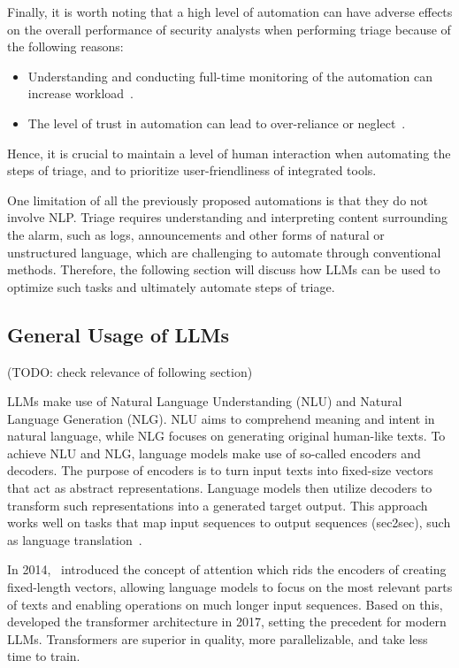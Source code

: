 Finally, it is worth noting that a high level of automation can have adverse effects on the overall performance of
security analysts when performing triage because of the following reasons:
\begin{itemize}
    \item Understanding and conducting full-time monitoring of the automation can increase
    workload\ \citep{kaber2004effects}.
    \item The level of trust in automation can lead to over-reliance or neglect\ \citep{lee2004trust}.
\end{itemize}
Hence, it is crucial to maintain a level of human interaction when automating the steps of triage, and to prioritize
user-friendliness of integrated tools.

One limitation of all the previously proposed automations is that they do not involve NLP\@.
Triage requires understanding and interpreting content surrounding the alarm, such as logs, announcements and other
forms of natural or unstructured language, which are challenging to automate through conventional methods.
Therefore, the following section will discuss how LLMs can be used to optimize such tasks and ultimately automate steps
of triage.

\subsection{General Usage of LLMs}
\label{subsec:rq1-use-of-llms}

(TODO: check relevance of following section) %

LLMs make use of Natural Language Understanding (NLU) and Natural Language Generation (NLG).
NLU aims to comprehend meaning and intent in natural language, while NLG focuses on generating original human-like
texts.
To achieve NLU and NLG, language models make use of so-called encoders and decoders.
The purpose of encoders is to turn input texts into fixed-size vectors that act as abstract representations.
Language models then utilize decoders to transform such representations into a generated target output.
This approach works well on tasks that map input sequences to output sequences (sec2sec), such as language
translation\ \citep{sutskever2014sequence, cho2014learning}.

In 2014,\ \citet{bahdanau2014neural} introduced the concept of attention which rids the encoders of creating
fixed-length vectors, allowing language models to focus on the most relevant parts of texts and enabling operations on
much longer input sequences.
Based on this,\ \citet{vaswani2017attention} developed the transformer architecture in 2017, setting the precedent for
modern LLMs.
Transformers are superior in quality, more parallelizable, and take less time to train.

